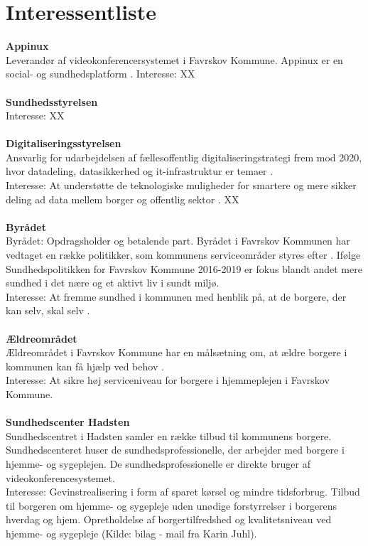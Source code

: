 \documentclass[10pt,a4paper]{article}
\begin{document}
\section{Interessentliste}
\textbf{Appinux}\\
 Leverandør af videokonferencersystemet i Favrskov Kommune. Appinux er en social- og sundhedsplatform \cite{appinuxwebsite}.
Interesse: XX\\ \\
\textbf{Sundhedsstyrelsen}\\
Interesse: XX\\ \\
\textbf{Digitaliseringsstyrelsen}\\
Ansvarlig for udarbejdelsen af fællesoffentlig digitaliseringstrategi frem mod 2020, hvor datadeling, datasikkerhed og it-infrastruktur er temaer \cite{digst1}.\\
Interesse: At understøtte de teknologiske muligheder for smartere og mere sikker deling ad data mellem borger og offentlig sektor \cite{digst2}. XX\\ \\
\textbf{Byrådet}\\
Byrådet: Opdragsholder og betalende part. Byrådet i Favrskov Kommunen har vedtaget en række politikker, som kommunens serviceområder styres efter \cite{favrskovkommune}. Ifølge Sundhedspolitikken for Favrskov Kommune 2016-2019 er fokus blandt andet mere sundhed i det nære og et aktivt liv i sundt miljø.\\
Interesse: At fremme sundhed i kommunen med henblik på, at de borgere, der kan selv, skal selv \cite{favrskovkommune2}.\\ \\
\textbf{Ældreområdet}\\
Ældreområdet i Favrskov Kommune har en målsætning om, at ældre borgere i kommunen kan få hjælp ved behov \cite{favrskovkommune3}.\\
Interesse: At sikre høj serviceniveau for borgere i hjemmeplejen i Favrskov Kommune. \\ \\
\textbf{Sundhedscenter Hadsten}\\
Sundhedscentret i Hadsten samler en række tilbud til kommunens borgere. Sundhedscenteret huser de sundhedsprofessionelle, der arbejder med borgere i hjemme- og sygeplejen. De sundhedsprofessionelle er direkte bruger af videokonferencesystemet.\\
Interesse: Gevinstrealisering i form af sparet kørsel og mindre tidsforbrug. Tilbud til borgeren om hjemme- og sygepleje uden unødige forstyrrelser i borgerens hverdag og hjem. Opretholdelse af borgertilfredshed og kvalitetsniveau ved hjemme- og sygepleje (Kilde: bilag - mail fra Karin Juhl).\\ \\
\end{document}
